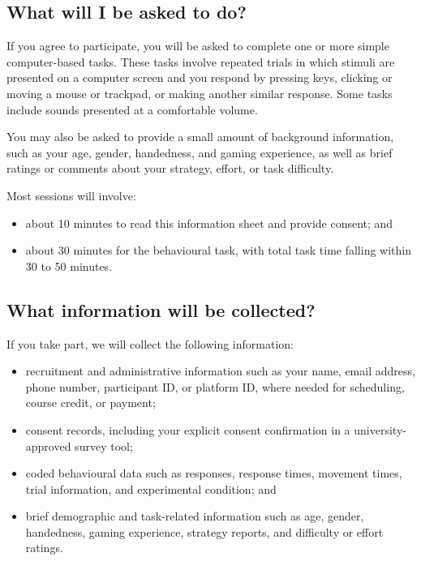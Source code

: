 \documentclass[letterpaper, 10pt]{article}
\let\oldsubsection\subsection
\renewcommand{\subsection}[1]{%
  \Needspace{10\baselineskip}%
  \oldsubsection{#1}%
}
\begin{document}
\subsection{What will I be asked to do?}
If you agree to participate, you will be asked to complete
one or more simple computer-based tasks. These tasks involve
repeated trials in which stimuli are presented on a computer
screen and you respond by pressing keys, clicking or moving
a mouse or trackpad, or making another similar response.
Some tasks include sounds presented at a comfortable volume.

You may also be asked to provide a small amount of
background information, such as your age, gender,
handedness, and gaming experience, as well as brief ratings
or comments about your strategy, effort, or task difficulty.

Most sessions will involve:
\begin{itemize}
\item about 10 minutes to read this information sheet and
    provide consent; and

\item about 30 minutes for the behavioural task, with total
    task time falling within 30 to 50 minutes.
\end{itemize}

\subsection{What information will be collected?}
If you take part, we will collect the following information:

\begin{itemize}
\item recruitment and administrative information such as
    your name, email address, phone number, participant ID,
    or platform ID, where needed for scheduling, course
    credit, or payment;

\item consent records, including your explicit consent
    confirmation in a university-approved survey tool;

\item coded behavioural data such as responses, response
    times, movement times, trial information, and
    experimental condition; and

\item brief demographic and task-related information such as
    age, gender, handedness, gaming experience, strategy
    reports, and difficulty or effort ratings.
\end{itemize}
\end{document}
